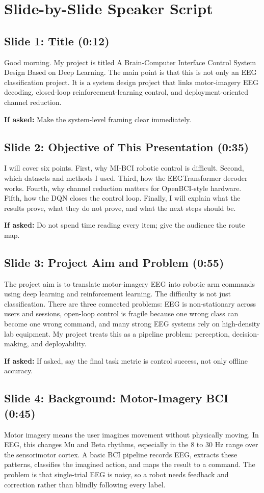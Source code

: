 \documentclass[11pt]{article}
\begin{document}
\section*{Slide-by-Slide Speaker Script}
\subsection*{Slide 1: Title (0:12)}
Good morning. My project is titled A Brain-Computer Interface Control System Design Based on Deep Learning. The main point is that this is not only an EEG classification project. It is a system design project that links motor-imagery EEG decoding, closed-loop reinforcement-learning control, and deployment-oriented channel reduction.


\textbf{If asked:} Make the system-level framing clear immediately.

\subsection*{Slide 2: Objective of This Presentation (0:35)}
I will cover six points. First, why MI-BCI robotic control is difficult. Second, which datasets and methods I used. Third, how the EEGTransformer decoder works. Fourth, why channel reduction matters for OpenBCI-style hardware. Fifth, how the DQN closes the control loop. Finally, I will explain what the results prove, what they do not prove, and what the next steps should be.


\textbf{If asked:} Do not spend time reading every item; give the audience the route map.

\subsection*{Slide 3: Project Aim and Problem (0:55)}
The project aim is to translate motor-imagery EEG into robotic arm commands using deep learning and reinforcement learning. The difficulty is not just classification. There are three connected problems: EEG is non-stationary across users and sessions, open-loop control is fragile because one wrong class can become one wrong command, and many strong EEG systems rely on high-density lab equipment. My project treats this as a pipeline problem: perception, decision-making, and deployability.


\textbf{If asked:} If asked, say the final task metric is control success, not only offline accuracy.

\subsection*{Slide 4: Background: Motor-Imagery BCI (0:45)}
Motor imagery means the user imagines movement without physically moving. In EEG, this changes Mu and Beta rhythms, especially in the 8 to 30 Hz range over the sensorimotor cortex. A basic BCI pipeline records EEG, extracts these patterns, classifies the imagined action, and maps the result to a command. The problem is that single-trial EEG is noisy, so a robot needs feedback and correction rather than blindly following every label.
\end{document}

